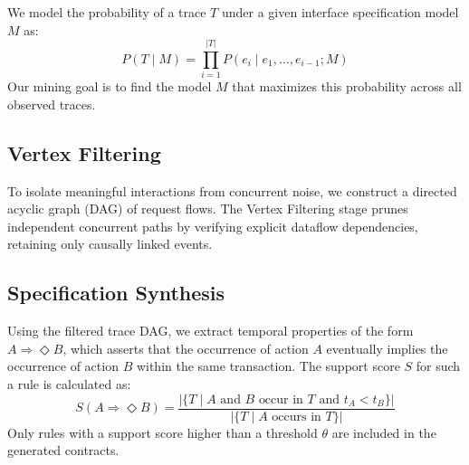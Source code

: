 We model the probability of a trace $T$ under a given interface specification model $M$ as:
\begin{equation}
  P(T \mid M) = \prod_{i=1}^{|T|} P(e_i \mid e_1, \dots, e_{i-1}; M)
  \label{eq:probability}
\end{equation}
Our mining goal is to find the model $M$ that maximizes this probability across all observed traces.

\subsection{Vertex Filtering}
To isolate meaningful interactions from concurrent noise, we construct a directed acyclic graph (DAG) of request flows. The Vertex Filtering stage prunes independent concurrent paths by verifying explicit dataflow dependencies, retaining only causally linked events.

\subsection{Specification Synthesis}
Using the filtered trace DAG, we extract temporal properties of the form $A \Rightarrow \Diamond B$, which asserts that the occurrence of action $A$ eventually implies the occurrence of action $B$ within the same transaction. The support score $S$ for such a rule is calculated as:
\begin{equation}
  S(A \Rightarrow \Diamond B) = \frac{|\{T \mid A \text{ and } B \text{ occur in } T \text{ and } t_A < t_B\}|}{|\{T \mid A \text{ occurs in } T\}|}
  \label{eq:support}
\end{equation}
Only rules with a support score higher than a threshold $\theta$ are included in the generated contracts.
